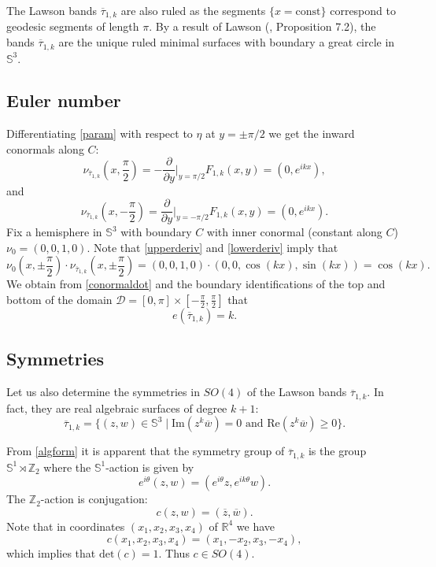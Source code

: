\documentclass[11pt, reqno]{amsart}
\numberwithin{equation}{section}
\begin{document}
The Lawson bands $\overline{\tau}_{1,k}$ are also ruled as the segments $\{x=\mbox{const}\}$ correspond to geodesic segments of length $\pi$.  By a result of Lawson (\cite{LS}, Proposition 7.2), the bands $\overline{\tau}_{1,k}$ are the unique ruled minimal surfaces with boundary a great circle in $\mathbb{S}^3$.
\subsection{Euler number}
Differentiating \eqref{param} with respect to $\eta$ at $y=\pm\pi/2$ we get the inward conormals along $C$:
\begin{equation}\label{upperderiv}
\nu_{\overline{\tau}_{1,k}}(x,\frac{\pi}{2}) = -\frac{\partial}{\partial y}\Big|_{y=\pi/2} F_{1,k}(x,y) =  (0,  e^{ikx}), 
\end{equation}
and 
\begin{equation}\label{lowerderiv}
\nu_{\overline{\tau}_{1,k}}(x,-\frac{\pi}{2}) = \frac{\partial}{\partial y}\Big|_{y=-\pi/2} F_{1,k}(x,y) =  (0,  e^{ikx}).
\end{equation}
Fix a hemisphere in $\mathbb{S}^3$ with boundary $C$ with inner conormal (constant along $C$) $\nu_0=(0,0,1,0)$. Note that \eqref{upperderiv} and \eqref{lowerderiv} imply that 
\begin{equation}\label{conormaldot}
\nu_0(x,\pm\frac{\pi}2{})\cdot \nu_{\overline{\tau}_{1,k}}(x,\pm\frac{\pi}{2})=(0,0,1,0)\cdot (0,0,\cos(kx),\sin(kx))=\cos(kx).  
\end{equation}
We obtain from \eqref{conormaldot} and the boundary identifications of the top and bottom of the domain $\mathcal{D}=[0,\pi]\times [-\frac{\pi}{2},\frac{\pi}{2}]$ that
\begin{equation}
e(\overline{\tau}_{1,k})= k.
\end{equation}
\subsection{Symmetries}\label{symmetries}
Let us also determine the symmetries in $SO(4)$ of the Lawson bands $\overline{\tau}_{1,k}$.  In fact, they are real algebraic surfaces of degree $k+1$:
\begin{equation}\label{algform}
\overline{\tau}_{1,k}=\{(z,w)\in\mathbb{S}^3\;|\;\mbox{Im}(z^{k}\overline{w})=0\mbox{ and } \mbox{Re}(z^{k}\overline{w})\geq0\}.
\end{equation}

From \eqref{algform} it is apparent that the symmetry group of $\overline{\tau}_{1,k}$ is the group $\mathbb{S}^1\rtimes\mathbb{Z}_2$ where the $\mathbb{S}^1$-action is given by 
\begin{equation}
e^{i\theta}(z,w) = (e^{i\theta}z,e^{ik\theta}w).  
\end{equation}
The $\mathbb{Z}_2$-action is conjugation:
\begin{equation}
c(z,w) = (\overline{z},\overline{w}).
\end{equation}
Note that in coordinates $(x_1,x_2,x_3,x_4)$ of $\mathbb{R}^4$ we have
\begin{equation}
c(x_1,x_2,x_3,x_4) = (x_1,-x_2,x_3,-x_4), 
\end{equation}
which implies that $\mbox{det}(c)=1$.  Thus $c\in SO(4)$.
\end{document}
